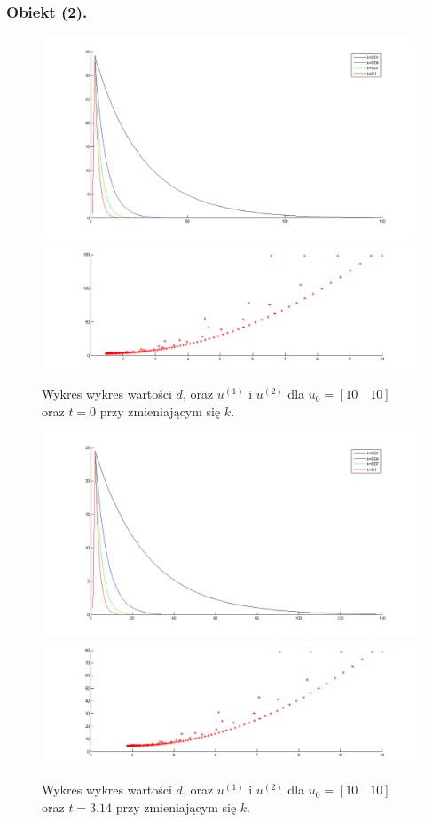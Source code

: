 \documentclass[a4paper,10pt]{article}
\begin{document}

\subsubsection{Obiekt (2).}





\begin{figure}[!h]
    \centering
	\includegraphics[width=120mm]{CW4-alg2fun2-u10_10-k001_01-t0-d.png}
	\includegraphics[width=120mm]{CW4-alg2fun2-u10_10-k001_01-t0-u.png}
	\caption{Wykres wykres wartości $d$, oraz $u^{(1)}$ i $u^{(2)}$ dla $u_0=[10 \quad 10]$ oraz $t=0$ przy zmieniającym się $k$.}
    \label{fig:Rysunek}
\end{figure}
\begin{figure}[!h]
    \centering
	\includegraphics[width=120mm]{CW4-alg2fun2-u10_10-k001_01-t314-d.png}
	\includegraphics[width=120mm]{CW4-alg2fun2-u10_10-k001_01-t314-u.png}
	\caption{Wykres wykres wartości $d$, oraz $u^{(1)}$ i $u^{(2)}$ dla $u_0=[10 \quad 10]$ oraz $t=3.14$ przy zmieniającym się $k$.}
    \label{fig:Rysunek}
\end{figure}
\end{document}
